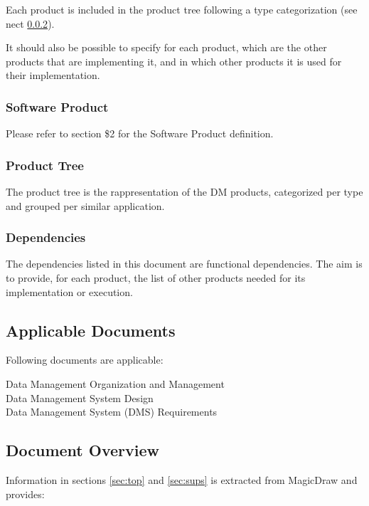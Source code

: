Each product is included in the product tree following a type categorization (see nect \ref{sec:ptree}).

It should also be possible to specify for each product, which are the other products that are implementing it, and in which other products it is used for their implementation.


\subsubsection{Software Product} \label{sec:swproduct}

Please refer to  section \$2 for the Software Product definition.


\subsubsection{Product Tree} \label{sec:ptree}

The product tree is the rappresentation of the DM products, categorized per type and grouped per similar application.


\subsubsection{Dependencies} \label{sec:dependencies}

The dependencies listed in this document are functional dependencies.
The aim is to provide, for each product, the list of other products needed for its implementation or execution. 


\subsection{Applicable Documents}

Following documents are applicable:

 Data Management Organization and Management\\
 Data Management System Design\\
 Data Management System (DMS) Requirements

\subsection{Document Overview}

Information in sections \ref{sec:top} and \ref{sec:sups} is extracted from MagicDraw and provides:

